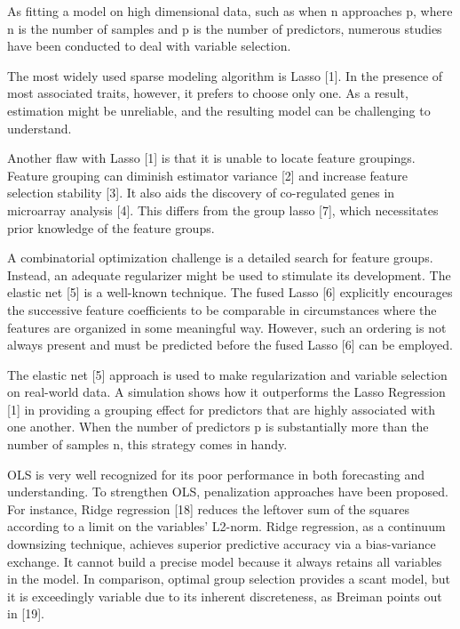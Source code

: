 \documentclass{article} %
\begin{document}
\noindent As fitting a model on high dimensional data, such as when n approaches p, where n is the number of samples and p is the number of predictors, numerous studies have been conducted to deal with variable selection.

\noindent The most widely used sparse modeling algorithm is Lasso [1]. In the presence of most associated traits, however, it prefers to choose only one. As a result, estimation might be unreliable, and the resulting model can be challenging to understand.

\noindent Another flaw with Lasso [1] is that it is unable to locate feature groupings. Feature grouping can diminish estimator variance [2] and increase feature selection stability [3]. It also aids the discovery of co-regulated genes in microarray analysis [4]. This differs from the group lasso [7], which necessitates prior knowledge of the feature groups.

\noindent A combinatorial optimization challenge is a detailed search for feature groups. Instead, an adequate regularizer might be used to stimulate its development. The elastic net [5] is a well-known technique. The fused Lasso [6] explicitly encourages the successive feature coefficients to be comparable in circumstances where the features are organized in some meaningful way. However, such an ordering is not always present and must be predicted before the fused Lasso [6] can be employed.

\noindent The elastic net [5] approach is used to make regularization and variable selection on real-world data. A simulation shows how it outperforms the Lasso Regression [1] in providing a grouping effect for predictors that are highly associated with one another. When the number of predictors p is substantially more than the number of samples n, this strategy comes in handy.

\noindent OLS is very well recognized for its poor performance in both forecasting and understanding. To strengthen OLS, penalization approaches have been proposed. For instance, Ridge regression [18] reduces the leftover sum of the squares according to a limit on the variables' L2-norm. Ridge regression, as a continuum downsizing technique, achieves superior predictive accuracy via a bias-variance exchange. It cannot build a precise model because it always retains all variables in the model. In comparison, optimal group selection provides a scant model, but it is exceedingly variable due to its inherent discreteness, as Breiman points out in [19].
\end{document}
